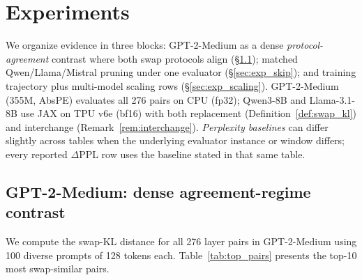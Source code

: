 \documentclass{article}
\begin{document}
\section{Experiments}
\label{sec:experiments}



We organize evidence in three blocks: GPT-2-Medium as a dense \emph{protocol-agreement} contrast where both swap protocols align (\S\ref{sec:exp_full}); matched Qwen/Llama/Mistral pruning under one evaluator (\S\ref{sec:exp_skip}); and training trajectory plus multi-model scaling rows (\S\ref{sec:exp_scaling}). GPT-2-Medium (355M, AbsPE) evaluates all 276 pairs on CPU (fp32); Qwen3-8B and Llama-3.1-8B use JAX on TPU v6e (bf16) with both replacement (Definition~\ref{def:swap_kl}) and interchange (Remark~\ref{rem:interchange}). \emph{Perplexity baselines} can differ slightly across tables when the underlying evaluator instance or window differs; every reported $\Delta$PPL row uses the baseline stated in that same table.

\subsection{GPT-2-Medium: dense agreement-regime contrast}
\label{sec:exp_full}

We compute the swap-KL distance for all 276 layer pairs in GPT-2-Medium using 100 diverse prompts of 128 tokens each. Table~\ref{tab:top_pairs} presents the top-10 most swap-similar pairs.
\end{document}

